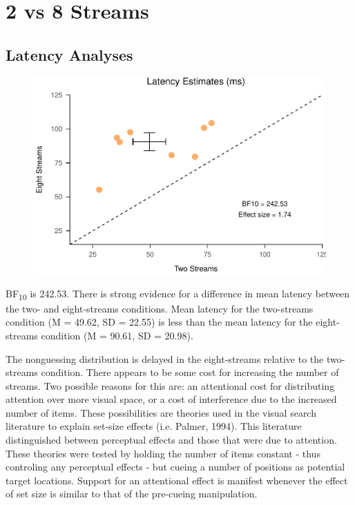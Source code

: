 \documentclass[,man]{apa6}
\theoremstyle{definition}
\theoremstyle{definition}
\theoremstyle{definition}
\theoremstyle{remark}
\begin{document}
\section{2 vs 8 Streams}\label{vs-8-streams}

\subsection{Latency Analyses}\label{latency-analyses}

\begin{figure}
\centering
\includegraphics{nStreams_Bayesian_files/figure-latex/unnamed-chunk-3-1.pdf}
\caption{}
\end{figure}

BF\textsubscript{10} is 242.53. There is strong evidence for a
difference in mean latency between the two- and eight-streams
conditions. Mean latency for the two-streams condition (M = 49.62, SD =
22.55) is less than the mean latency for the eight-streams condition (M
= 90.61, SD = 20.98).

The nonguessing distribution is delayed in the eight-streams relative to
the two-streams condition. There appears to be some cost for increasing
the number of streams. Two possible reasons for this are: an attentional
cost for distributing attention over more visual space, or a cost of
interference due to the increased number of items. These possibilities
are theories used in the visual search literature to explain set-size
effects (i.e. Palmer, 1994). This literature distinguished between
perceptual effects and those that were due to attention. These theories
were tested by holding the number of items constant - thus controling
any perceptual effects - but cueing a number of positions as potential
target locations. Support for an attentional effect is manifest whenever
the effect of set size is similar to that of the pre-cueing
manipulation.
\end{document}
